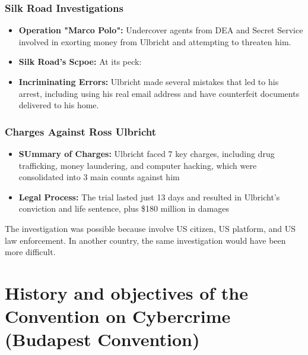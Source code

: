 \subsubsection{Silk Road Investigations}

\begin{itemize}[itemsep=0pt]
  \item \textbf{Operation "Marco Polo":} Undercover agents from DEA and Secret Service involved in exorting money from Ulbricht and attempting to threaten him.
  \item \textbf{Silk Road's Scpoe:} At its peck:
    \begin{itemize}[itemsep=0pt, topsep=0pt]
    \end{itemize}
  \item \textbf{Incriminating Errors:} Ulbricht made several mistakes that led to his arrest, including using his real email address and have counterfeit documents delivered to his home.
\end{itemize}

\subsubsection{Charges Against Ross Ulbricht}
\begin{itemize}[itemsep=0pt]
  \item \textbf{SUmmary of Charges:} Ulbricht faced 7 key charges, including drug trafficking, money laundering, and computer hacking, which were consolidated into 3 main counts against him
  \item \textbf{Legal Process:} The trial lasted just 13 days and resulted in Ulbricht's conviction and life sentence, plus \$180 million in damages
\end{itemize}

The investigation was possible because involve US citizen, US platform, and US law enforcement. In another country, the same investigation would have been more difficult.

\section{History and objectives of the Convention on Cybercrime (Budapest Convention)}

